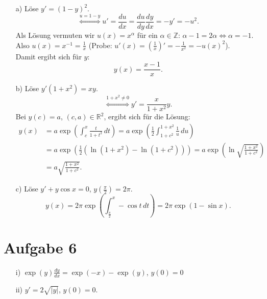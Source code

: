 \documentclass[11pt]{article}
\theoremstyle{plain}
\theoremstyle{definition}
\theoremstyle{remark}
\newcommand{\Z}{\mathbb{Z}}
\newcommand{\R}{\mathbb{R}}
\begin{document}
\begin{itemize}
\item[a)] Löse $ y' = (1-y)^2 $. 
\[ \overset{u = 1-y}{\Longleftrightarrow} u' = \frac{du}{dx} = \frac{du}{dy} \frac{dy}{dx} = -y' = -u^2. \] 
Als Lösung vermuten wir $ u(x) = x^\alpha $ für ein $ \alpha \in \Z $: $ \alpha - 1 = 2\alpha \Longleftrightarrow \alpha = -1 $. \\ 
Also $ u(x) = x^{-1} = \frac{1}{x} $ (Probe: $ u'(x) = \left( \frac{1}{x} \right)' = -\frac{1}{x^2} = -u(x)^2 $). \\ 
Damit ergibt sich für $ y $: 
\[ y(x) = \frac{x-1}{x}. \] 
\item[b)] Löse $ y'(1+x^2) = xy $. 
\[ \overset{1+x^2\neq0}{\Longleftrightarrow} y' = \frac{x}{1+x^2}y. \] 
Bei $ y(c) = a $, $ (c,a) \in\R^2 $,  ergibt sich für die Lösung: 
\begin{align*}
y(x) 
&= a\exp\left(\int_c^x \frac{t}{1+t^2} \, dt \right) 
= a\exp\left(\frac{1}{2} \int_{1+c^2}^{1+x^2} \frac{1}{u} \, du \right) \\ 
&= a\exp\left(\frac{1}{2}\left(\ln\left(1+x^2\right) - \ln\left(1+c^2\right)\right) \right) 
= a\exp\left(\ln\sqrt{\frac{1+x^2}{1+c^2}}\right) \\ 
&= a\sqrt{\frac{1+x^2}{1+c^2}}.
\end{align*}
\item[c)] Löse $ y' + y\cos x = 0 $, $ y\left(\frac{\pi}{2}\right) = 2\pi $. 
\[ y(x) = 2\pi\exp\left(\int_{\frac{\pi}{2}}^x - \cos t \, dt \right) = 2\pi\exp(1-\sin x). \] 
\end{itemize}


\section*{Aufgabe 6}

\begin{itemize}
\item[i)] 
$ \exp(y) \frac{dy}{dx} = \exp(-x)-\exp(y) $, $ y(0)=0 $ 
\item[ii)] 
$ y' = 2\sqrt{|y|} $, $ y(0)=0 $. \\ 
\end{itemize} 
\end{document}
